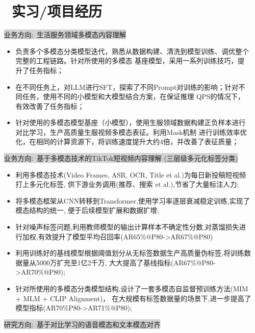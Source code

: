 \documentclass{resume}
\begin{document}
\section{\faUsers\ 实习/项目经历}
\colorbox{lightgray}{业务方向:\ 生活服务领域多模态内容理解}
\begin{itemize}[parsep=1.0ex]
  \item 负责多个多模态分类模型迭代，熟悉从数据构建、清洗到模型训练、调优整个完整的工程链路。针对所使用的多模态
  基座模型，采用一系列训练技巧，提升了任务指标；
  \item 在不同任务上，对LLM进行SFT，探索了不同Prompt对训练的影响；针对不同任务，使用不同的小模型和大模型结合方案，在保证推理
  QPS的情况下，有效改善了任务指标；
  \item 针对使用的多模态模型基座（小模型），使用生服领域数据构建正负样本进行对比学习，生产高质量生服视频多模态表征。利用Mask机制
  进行训练效率优化，在相同的计算资源下，将训练速度提升大约4倍，并改善了表征质量；
\end{itemize}
\colorbox{lightgray}{业务方向:\ 基于多模态技术的TikTok短视频内容理解 (三层级多元化标签分类)}
\begin{itemize}[parsep=1.0ex]
  \item 利用多模态技术(Video Frames, ASR, OCR, Title et al.)为每日新投稿短视频打上多元化标签,
  供下游业务调用(推荐、搜索 et al.),节省了大量标注人力;
  \item 将多模态框架从CNN转移到Transformer,使用学习率逐层衰减稳定训练,实现了模态结构的统一,
  便于后续模型扩展和数据扩增;
  \item 针对噪声标签问题,利用教师模型的输出计算样本不确定性分数,对蒸馏损失进行加权,有效提升了模型平均召回率(AR65\%@P80->AR67\%@P80)
  \item 利用训练好的基线模型根据阈值划分从无标签数据生产高质量伪标签,将训练数据量从5000万扩充至1亿2千万,
  大大提高了基线指标(AR67\%@P80->AR70\%@P80);
  \item 针对所使用的多模态分类模型结构,设计了一套多模态自监督预训练方法(MIM + MLM + CLIP Alignment)，
  在大规模有标签数据量的场景下,进一步提高了模型指标(AR70\%P80->AR71\%@P80);
\end{itemize}
\colorbox{lightgray}{研究方向:\ 基于对比学习的语音模态和文本模态对齐}
\href{https://arxiv.org/abs/2204.10461}{\textcolor{linkcolor}{\faExternalLink}}
\end{document}
